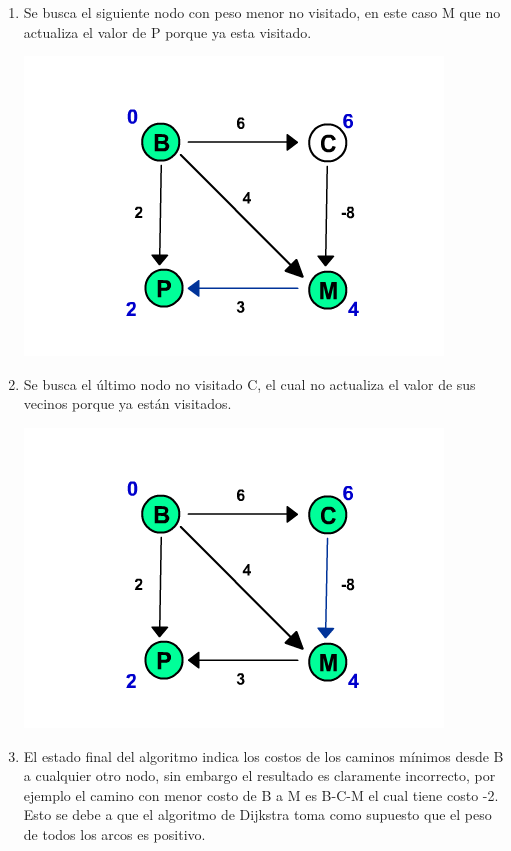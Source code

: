 \documentclass[dcc,sol]{fcfmcourse}
\begin{document}
\begin{problems}
\begin{enumerate}[1.]
\newpage
\item Se busca el siguiente nodo con peso menor no visitado, en este caso M que no actualiza el valor de P porque ya esta visitado.
\begin{center}
\includegraphics[scale=0.65]{dijkstra0011.png}
\end{center}

\item Se busca el último nodo no visitado C, el cual no actualiza el valor de sus vecinos porque ya están visitados.
\begin{center}
\includegraphics[scale=0.65]{dijkstra0012.png}
\end{center}

\item El estado final del algoritmo indica los costos de los caminos mínimos desde B a cualquier otro nodo, sin embargo el resultado es claramente incorrecto, por ejemplo el camino con menor costo de B a M es B-C-M el cual tiene costo -2. Esto se debe a que el algoritmo de Dijkstra toma como supuesto que el peso de todos los arcos es positivo.


\end{enumerate}
\end{problems}
\end{document}
